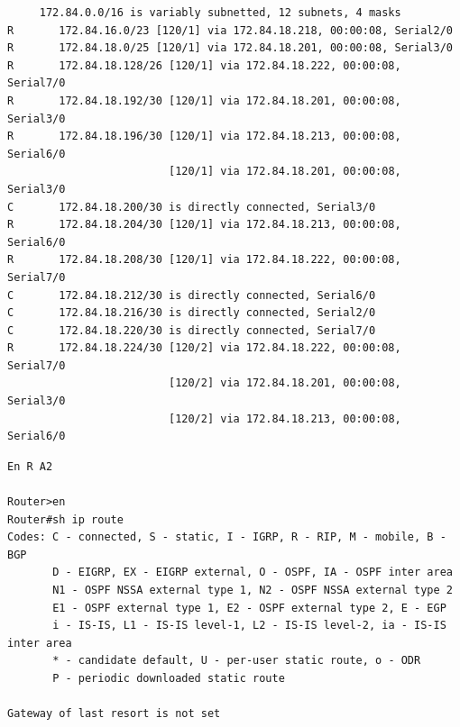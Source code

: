 \documentclass[twoside, 11pt]{article}
\begin{document}
\begin{enumerate}
\begin{center}
\begin{verbatim}
     172.84.0.0/16 is variably subnetted, 12 subnets, 4 masks
R       172.84.16.0/23 [120/1] via 172.84.18.218, 00:00:08, Serial2/0
R       172.84.18.0/25 [120/1] via 172.84.18.201, 00:00:08, Serial3/0
R       172.84.18.128/26 [120/1] via 172.84.18.222, 00:00:08, Serial7/0
R       172.84.18.192/30 [120/1] via 172.84.18.201, 00:00:08, Serial3/0
R       172.84.18.196/30 [120/1] via 172.84.18.213, 00:00:08, Serial6/0
                         [120/1] via 172.84.18.201, 00:00:08, Serial3/0
C       172.84.18.200/30 is directly connected, Serial3/0
R       172.84.18.204/30 [120/1] via 172.84.18.213, 00:00:08, Serial6/0
R       172.84.18.208/30 [120/1] via 172.84.18.222, 00:00:08, Serial7/0
C       172.84.18.212/30 is directly connected, Serial6/0
C       172.84.18.216/30 is directly connected, Serial2/0
C       172.84.18.220/30 is directly connected, Serial7/0
R       172.84.18.224/30 [120/2] via 172.84.18.222, 00:00:08, Serial7/0
                         [120/2] via 172.84.18.201, 00:00:08, Serial3/0
                         [120/2] via 172.84.18.213, 00:00:08, Serial6/0
\end{verbatim}
\label{list:2.1.1.4.1}

\begin{verbatim}
En R A2

Router>en
Router#sh ip route
Codes: C - connected, S - static, I - IGRP, R - RIP, M - mobile, B - BGP
       D - EIGRP, EX - EIGRP external, O - OSPF, IA - OSPF inter area
       N1 - OSPF NSSA external type 1, N2 - OSPF NSSA external type 2
       E1 - OSPF external type 1, E2 - OSPF external type 2, E - EGP
       i - IS-IS, L1 - IS-IS level-1, L2 - IS-IS level-2, ia - IS-IS inter area
       * - candidate default, U - per-user static route, o - ODR
       P - periodic downloaded static route

Gateway of last resort is not set


\end{verbatim}
\end{center}
\end{enumerate}
\end{document}
